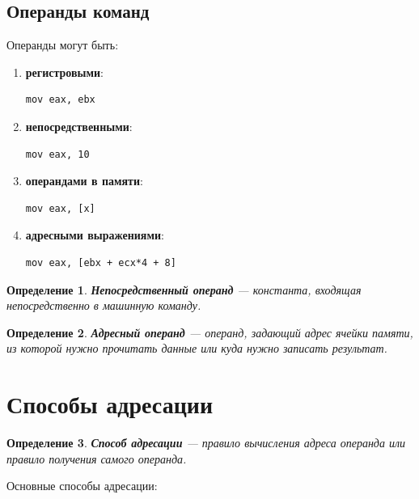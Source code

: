 \documentclass[12pt,a4paper]{article}
\newtheorem{definition}{Определение}
\begin{document}
\subsection{Операнды команд}

Операнды могут быть:

\begin{enumerate}
    \item \textbf{регистровыми}:
\begin{lstlisting}
mov eax, ebx
\end{lstlisting}

    \item \textbf{непосредственными}:
\begin{lstlisting}
mov eax, 10
\end{lstlisting}

    \item \textbf{операндами в памяти}:
\begin{lstlisting}
mov eax, [x]
\end{lstlisting}

    \item \textbf{адресными выражениями}:
\begin{lstlisting}
mov eax, [ebx + ecx*4 + 8]
\end{lstlisting}
\end{enumerate}

\begin{definition}
\textbf{Непосредственный операнд} --- константа, входящая непосредственно в машинную команду.
\end{definition}

\begin{definition}
\textbf{Адресный операнд} --- операнд, задающий адрес ячейки памяти, из которой нужно прочитать данные или куда нужно записать результат.
\end{definition}

\section{Способы адресации}

\begin{definition}
\textbf{Способ адресации} --- правило вычисления адреса операнда или правило получения самого операнда.
\end{definition}

Основные способы адресации:
\end{document}
